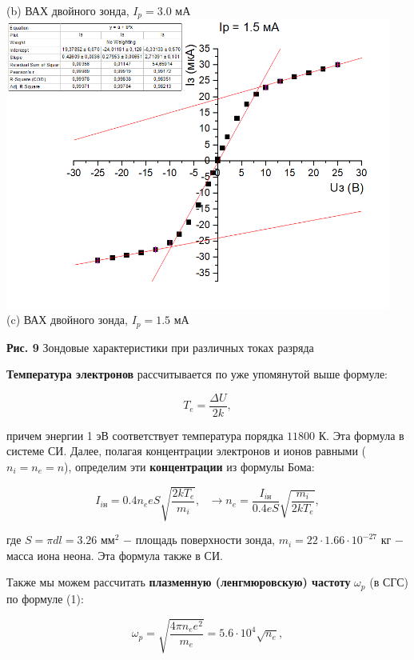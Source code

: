 \documentclass[a4paper,12pt]{article} %
\begin{document}
\begin{center}
(b) ВАХ двойного зонда, $I_{p} = 3.0$ мА  \\
\includegraphics[width=0.95\textwidth]{3.5.1_11.png}\\
(c) ВАХ двойного зонда, $I_{p} = 1.5$ мА  \\
\end{center}

\begin{center}
\textbf{Рис. 9} Зондовые характеристики при различных токах разряда
\end{center}

\hfill \break \textbf{Температура электронов} рассчитывается по уже упомянутой выше формуле:

$$
T_{e} = \frac{\Delta U}{2k},
$$

\hfill \break причем энергии 1 эВ соответствует температура порядка $11800$ К. Эта формула в системе СИ. Далее, полагая концентрации электронов и ионов равными ($n_{i} = n_{e} = n$), определим эти \textbf{концентрации} из формулы Бома:

$$
I_{i\text{н}} = 0.4n_{e}eS\sqrt{\frac{2kT_{e}}{m_{i}}}, \text{ } \rightarrow n_{e} = \frac{I_{i\text{н}}}{0.4eS}\sqrt{\frac{m_{i}}{2kT_{e}}},
$$

\hfill \break где $S = \pi dl = 3.26$ $\text{мм}^2$ $-$ площадь поверхности зонда, $m_{i} = 22 \cdot 1.66 \cdot 10^{-27}$ кг $-$ масса иона неона. Эта формула также в СИ.

\hfill \break Также мы можем рассчитать \textbf{плазменную (ленгмюровскую) частоту} $\omega_{p}$ (в СГС) по формуле (1):

$$
\omega_{p} = \sqrt{\frac{4\pi n_{e}e^2}{m_{e}}} = 5.6 \cdot 10^4 \sqrt{n_{e}},
$$
\end{document}
